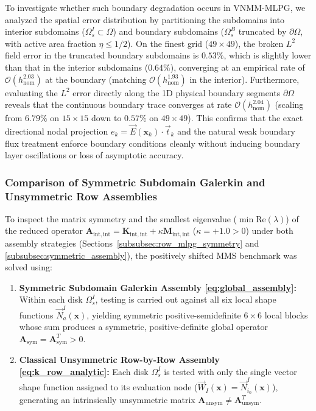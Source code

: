 \documentclass[VANCOUVER,Times1COL]{WileyNJD-v5}
\begin{document}
\begin{enumerate}
          To investigate whether such boundary degradation occurs in VNMM-MLPG, we analyzed the spatial error distribution by partitioning the subdomains into interior subdomains ($\Omega_s^I \subset \Omega$) and boundary subdomains ($\Omega_s^B$ truncated by $\partial\Omega$, with active area fraction $\eta \le 1/2$).
          On the finest grid ($49 \times 49$), the broken $L^2$ field error in the truncated boundary subdomains is $\mathbf{0.53\%}$, which is slightly lower than that in the interior subdomains ($\mathbf{0.64\%}$), converging at an empirical rate of $\mathcal{O}(h_{\mathrm{nom}}^{2.03})$ at the boundary (matching $\mathcal{O}(h_{\mathrm{nom}}^{1.93})$ in the interior).
          Furthermore, evaluating the $L^2$ error directly along the 1D physical boundary segments $\partial\Omega$ reveals that the continuous boundary trace converges at rate $\mathcal{O}(h_{\mathrm{nom}}^{2.04})$ (scaling from $6.79\%$ on $15\times 15$ down to $0.57\%$ on $49\times 49$).
          This confirms that the exact directional nodal projection $e_k = \vec{E}(\mathbf{x}_k) \cdot \vec{t}_k$ and the natural weak boundary flux treatment enforce boundary conditions cleanly without inducing boundary layer oscillations or loss of asymptotic accuracy.
\end{enumerate}

\subsubsection{Comparison of Symmetric Subdomain Galerkin and Unsymmetric Row Assemblies}
\label{subsubsec:mms_assembly_comparison}

To inspect the matrix symmetry and the smallest eigenvalue ($\min\mathrm{Re}(\lambda)$) of the reduced operator $\mathbf{A}_{\mathrm{int},\mathrm{int}} = \mathbf{K}_{\mathrm{int},\mathrm{int}} + \kappa\mathbf{M}_{\mathrm{int},\mathrm{int}}$ ($\kappa = +1.0 > 0$) under both assembly strategies (Sections~\ref{subsubsec:row_mlpg_symmetry} and \ref{subsubsec:symmetric_assembly}), the positively shifted MMS benchmark was solved using:
\begin{enumerate}
    \item \textbf{Symmetric Subdomain Galerkin Assembly \eqref{eq:global_assembly}:} Within each disk $\Omega_s^I$, testing is carried out against all six local shape functions $\vec{N}_a^I(\mathbf{x})$, yielding symmetric positive-semidefinite $6 \times 6$ local blocks whose sum produces a symmetric, positive-definite global operator $\mathbf{A}_{\mathrm{sym}} = \mathbf{A}_{\mathrm{sym}}^T > 0$.
    \item \textbf{Classical Unsymmetric Row-by-Row Assembly \eqref{eq:k_row_analytic}:} Each disk $\Omega_s^I$ is tested with only the single vector shape function assigned to its evaluation node ($\vec{W}_I(\mathbf{x}) = \vec{N}_{i_0}^I(\mathbf{x})$), generating an intrinsically unsymmetric matrix $\mathbf{A}_{\mathrm{unsym}} \ne \mathbf{A}_{\mathrm{unsym}}^T$.
\end{enumerate}
\end{document}
